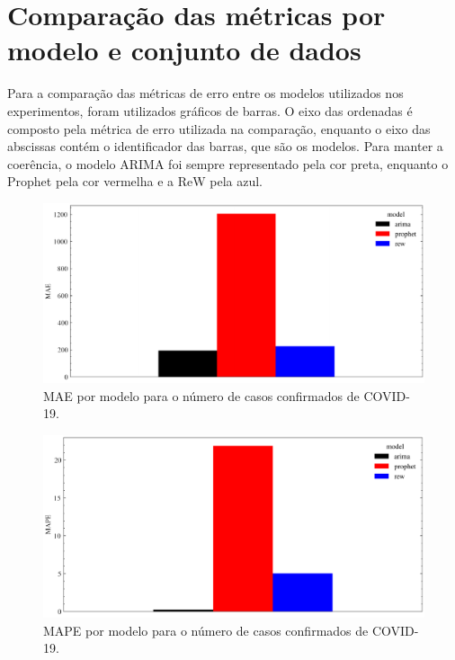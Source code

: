 \chapter{Comparação das métricas por modelo e conjunto de dados}
\label{apen:a}

Para a comparação das métricas de erro entre os modelos utilizados nos experimentos, foram utilizados gráficos de barras. O eixo das ordenadas é composto pela métrica de erro utilizada na comparação, enquanto o eixo das abscissas contém o identificador das barras, que são os modelos. Para manter a coerência, o modelo ARIMA foi sempre representado pela cor preta, enquanto o Prophet pela cor vermelha e a ReW pela azul.

\begin{figure}[!htp]
    \centering
    \includegraphics[width=5.0in]{img/covid_mae_comparison.pdf}
    \caption{MAE por modelo para o número de casos confirmados de COVID-19.}
\end{figure}

\begin{figure}[!htp]
    \centering
    \includegraphics[width=5.0in]{img/covid_mape_comparison.pdf}
    \caption{MAPE por modelo para o número de casos confirmados de COVID-19.}
\end{figure}

